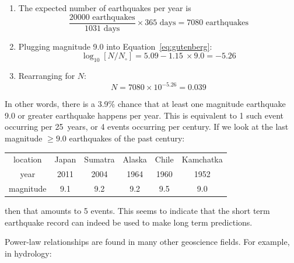 \begin{enumerate}
\item The expected number of earthquakes per year is
  \[
  \frac{20000\mbox{~earthquakes}}{1031\mbox{~days}}\times{365}\mbox{~days}
  = 7080 \mbox{~earthquakes}
  \]

\item Plugging magnitude 9.0 into Equation~\ref{eq:gutenberg}:
  \[
  \log_{10}[N/N_\circ] = 5.09 -1.15~\times{9.0} = -5.26
  \]

\item Rearranging for $N$:
  \[
  N = 7080 \times 10^{-5.26} = 0.039
  \]
\end{enumerate}

In other words, there is a 3.9\% chance that at least one magnitude
earthquake 9.0 or greater earthquake happens per year. This is
equivalent to 1 such event occurring per 25~years, or 4 events
occurring per century. If we look at the last magnitude $\geq{9.0}$
earthquakes of the past century:

\begin{center}
  \begin{tabular}{c|ccccc}
    location & Japan & Sumatra & Alaska & Chile & Kamchatka \\
    year & 2011 & 2004 & 1964 & 1960 & 1952 \\
    magnitude & 9.1 & 9.2 & 9.2 & 9.5 & 9.0
  \end{tabular}
\end{center}

\noindent then that amounts to 5 events. This seems to indicate that
the short term earthquake record can indeed be used to make long term
predictions.\medskip

Power-law relationships are found in many other geoscience fields. For
example, in hydrology:


